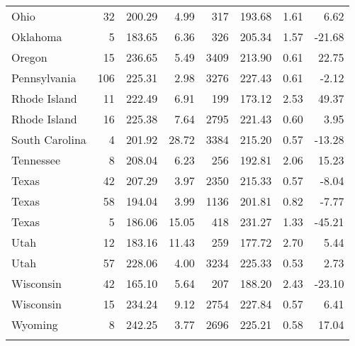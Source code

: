 \begin{longtable}{lrrr@{\extracolsep{10pt}}rrrr}
  Ohio &  32 & 200.29 & 4.99 & 317 & 193.68 & 1.61 & 6.62 \\ 
  Oklahoma &   5 & 183.65 & 6.36 & 326 & 205.34 & 1.57 & -21.68 \\ 
  Oregon &  15 & 236.65 & 5.49 & 3409 & 213.90 & 0.61 & 22.75 \\ 
  Pennsylvania & 106 & 225.31 & 2.98 & 3276 & 227.43 & 0.61 & -2.12 \\ 
  Rhode Island &  11 & 222.49 & 6.91 & 199 & 173.12 & 2.53 & 49.37 \\ 
  Rhode Island &  16 & 225.38 & 7.64 & 2795 & 221.43 & 0.60 & 3.95 \\ 
  South Carolina &   4 & 201.92 & 28.72 & 3384 & 215.20 & 0.57 & -13.28 \\ 
  Tennessee &   8 & 208.04 & 6.23 & 256 & 192.81 & 2.06 & 15.23 \\ 
  Texas &  42 & 207.29 & 3.97 & 2350 & 215.33 & 0.57 & -8.04 \\ 
  Texas &  58 & 194.04 & 3.99 & 1136 & 201.81 & 0.82 & -7.77 \\ 
  Texas &   5 & 186.06 & 15.05 & 418 & 231.27 & 1.33 & -45.21 \\ 
  Utah &  12 & 183.16 & 11.43 & 259 & 177.72 & 2.70 & 5.44 \\ 
  Utah &  57 & 228.06 & 4.00 & 3234 & 225.33 & 0.53 & 2.73 \\ 
  Wisconsin &  42 & 165.10 & 5.64 & 207 & 188.20 & 2.43 & -23.10 \\ 
  Wisconsin &  15 & 234.24 & 9.12 & 2754 & 227.84 & 0.57 & 6.41 \\ 
  Wyoming &   8 & 242.25 & 3.77 & 2696 & 225.21 & 0.58 & 17.04 \\ 
   \hline
\hline
\label{g4readingtreelevel1}
\end{longtable}
